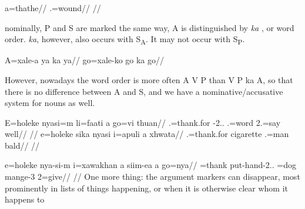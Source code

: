 \a 
\begingl 
\gla {*}a=thathe//
.=wound//
\glft {}//
\endgl 
\xe

nominally, P and S are marked the same way, A is distinguished by \textit{ka} , or word order. 
\textit{ka}, however, also occurs with S\textsubscript{A}. It may not occur with S\textsubscript{P}. %

\pex 
\a 
\begingl 
\gla A=xale-a ya ka ya//
\endgl 
\a 
\begingl 
\gla go=xale-ko go ka go//
\endgl
\xe

However, nowadays the word order is more often A V P than V P ka A, so that there is no difference between A and S, and we have a nominative/accusative system for nouns as well.

\pex
\a
\begingl
\gla E=holeke nyasi=m li=faati a go=vi thuan//
.=thank.for -2.. .=word  2.=say well//
\glft {}//
\endgl 
\a
\begingl
\gla e=holeke sika nyasi i=apuli a xhwata//
.=thank.for cigarette  .=man  bald//
\glft {}//
\endgl 

\a
\begingl
\gla e=holeke nya-si-m i=xawakhan a siim-ea a go=nya// 
=thank put-hand-2.. =dog  mange-3 2=give//
\glft {}//
\endgl
\xe
One more thing: the argument markers can disappear, most prominently in lists of things happening, or when it is otherwise clear whom it happens to
